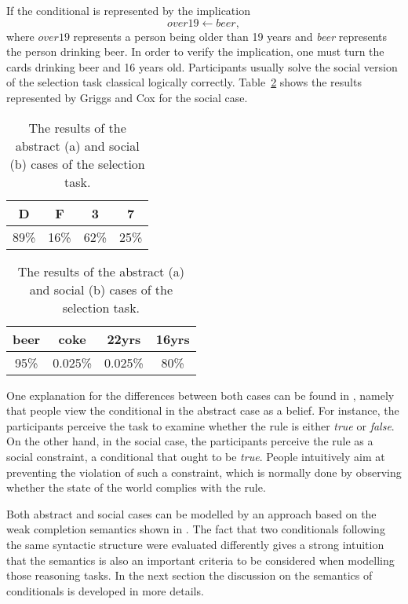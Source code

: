 If the conditional is represented by the implication 
\[
over19 \leftarrow beer,
\]
where $over19$ represents a person being older than 19 years and \textit{beer} represents the person drinking beer. In order to verify the implication, one must turn the cards drinking beer and 16 years old. Participants usually solve the social version of the selection task classical logically correctly. Table~\ref{table:social} shows the results represented by Griggs and Cox \cite{cox1982effects} for the social case. 

\begin{table}
	\centering
	\begin{subtable}[h]{0.30\textwidth}
		\begin{tabular}{cccc}
			D & F & 3 & 7 \\
			\hline
			89\% & 16\% & 62\% & 25\%
		\end{tabular}
		\bigskip
		\caption{Abstract case.}
		\label{table:abstract}
	\end{subtable}
	\hspace{2cm}
	\begin{subtable}[h]{0.30\textwidth}
		\begin{tabular}{cccc}
			beer & coke & 22yrs& 16yrs\\
			\hline
			95\% & 0.025\% & 0.025\% & 80\%
		\end{tabular}
		\bigskip
		\caption{Social case.}
		\label{table:social}
	\end{subtable}
	\hspace{1cm}
	\bigskip
	\caption{The results of the abstract (a) and social (b) cases of the selection task.}
\end{table}

One explanation for the differences between both cases can be found in \cite{kowalski2011computational}, namely that people view the conditional in the abstract case as a belief. For instance, the participants perceive the task to examine whether the rule is either \textit{true} or \textit{false}. On the other hand, in the social case, the participants perceive the rule as a social constraint, a conditional that ought to be \textit{true}. People intuitively aim at preventing the violation of such a constraint, which is normally done by observing whether the state of the world complies with the rule.

Both abstract and social cases can be modelled by an approach based on the weak completion semantics shown in \cite{dietz2013computational}. The fact that two conditionals following the same syntactic structure were evaluated differently gives a strong intuition that the semantics is also an important criteria to be considered when modelling those reasoning tasks. In the next section the discussion on the semantics of conditionals is developed in more details.

